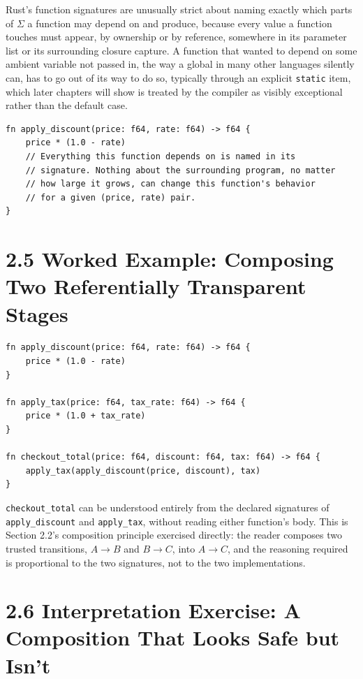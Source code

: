 \documentclass[11pt]{book}
\begin{document}
Rust's function signatures are unusually strict about naming exactly which parts of $\Sigma$ a function may depend on and produce, because every value a function touches must appear, by ownership or by reference, somewhere in its parameter list or its surrounding closure capture. A function that wanted to depend on some ambient variable not passed in, the way a global in many other languages silently can, has to go out of its way to do so, typically through an explicit \texttt{static} item, which later chapters will show is treated by the compiler as visibly exceptional rather than the default case.

\begin{lstlisting}
fn apply_discount(price: f64, rate: f64) -> f64 {
    price * (1.0 - rate)
    // Everything this function depends on is named in its
    // signature. Nothing about the surrounding program, no matter
    // how large it grows, can change this function's behavior
    // for a given (price, rate) pair.
}
\end{lstlisting}

\section*{2.5 Worked Example: Composing Two Referentially Transparent Stages}

\begin{lstlisting}
fn apply_discount(price: f64, rate: f64) -> f64 {
    price * (1.0 - rate)
}

fn apply_tax(price: f64, tax_rate: f64) -> f64 {
    price * (1.0 + tax_rate)
}

fn checkout_total(price: f64, discount: f64, tax: f64) -> f64 {
    apply_tax(apply_discount(price, discount), tax)
}
\end{lstlisting}

\texttt{checkout\_total} can be understood entirely from the declared signatures of \texttt{apply\_discount} and \texttt{apply\_tax}, without reading either function's body. This is Section 2.2's composition principle exercised directly: the reader composes two trusted transitions, $A \to B$ and $B \to C$, into $A \to C$, and the reasoning required is proportional to the two signatures, not to the two implementations.

\section*{2.6 Interpretation Exercise: A Composition That Looks Safe but Isn't}
\end{document}
